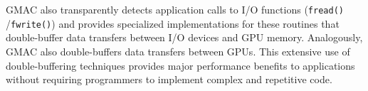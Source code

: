 GMAC also transparently detects application calls to I\slash O functions (\eg \texttt{fread()} 
\slash \texttt{fwrite()}) and provides specialized implementations for these routines that 
double\hyp{}buffer data transfers between I\slash O devices and GPU memory. Analogously, GMAC also 
double\hyp{}buffers data transfers between GPUs. This extensive use of double\hyp{}buffering 
techniques provides major performance benefits to applications without requiring programmers to 
implement complex and repetitive code.


